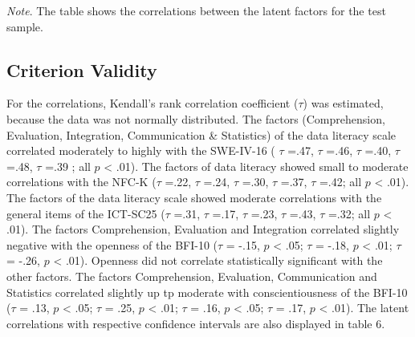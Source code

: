 \documentclass[
  12pt,
  a4paper,
  twoside]{article}
\begin{document}
\begin{table}[htpb]
\caption{Latent Factor correlations test sample}


\vspace{10pt}  %
\small\textit{Note}. The table shows the correlations between the latent factors for the test sample.
\end{table}

\subsection{Criterion Validity}\label{criterion-validity}

For the correlations, Kendall's rank correlation coefficient (\(\tau\)) was estimated, because the data was not normally distributed. The factors (Comprehension, Evaluation, Integration, Communication \& Statistics) of the data literacy scale correlated moderately to highly with the SWE-IV-16 ( \(\tau\) =.47, \(\tau\) =.46, \(\tau\) =.40, \(\tau\) =.48, \(\tau\) =.39 ; all \(p\) \textless{} .01). The factors of data literacy showed small to moderate correlations with the NFC-K (\(\tau\) =.22, \(\tau\) =.24, \(\tau\) =.30, \(\tau\) =.37, \(\tau\) =.42; all \(p\) \textless{} .01). The factors of the data literacy scale showed moderate correlations with the general items of the ICT-SC25 (\(\tau\) =.31, \(\tau\) =.17, \(\tau\) =.23, \(\tau\) =.43, \(\tau\) =.32; all \(p\) \textless{} .01). The factors Comprehension, Evaluation and Integration correlated slightly negative with the openness of the BFI-10 (\(\tau\) = -.15, \(p\) \textless{} .05; \(\tau\) = -.18, \(p\) \textless{} .01; \(\tau\) = -.26, \(p\) \textless{} .01). Openness did not correlate statistically significant with the other factors. The factors Comprehension, Evaluation, Communication and Statistics correlated slightly up tp moderate with conscientiousness of the BFI-10 (\(\tau\) = .13, \(p\) \textless{} .05; \(\tau\) = .25, \(p\) \textless{} .01; \(\tau\) = .16, \(p\) \textless{} .05; \(\tau\) = .17, \(p\) \textless{} .01). The latent correlations with respective confidence intervals are also displayed in table 6.
\end{document}
